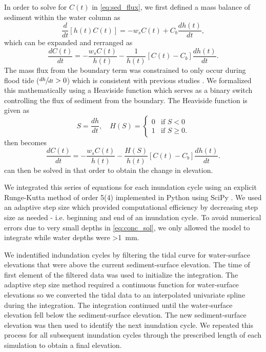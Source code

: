In order to solve for $C(t)$ in \cref{eq:sed_flux}, we first defined a mass balance of sediment within the water column as
\begin{equation}\label{eq:conc_mass_bal}
	\frac{d}{dt}[h(t)C(t)] = -w_s C(t) + C_b \frac{dh(t)}{dt},
\end{equation}
which can be expanded and rerranged as
\begin{equation}\label{eq:conc_dt}
	\frac{dC(t)}{dt} = - \frac{w_sC(t)}{h(t)} - \frac{1}{h(t)}[C(t) - C_b]\frac{dh(t)}{dt}.
\end{equation}
The mass flux from the boundary term was constrained to only occur during flood tide ($\sfrac{dh}{dt} > 0$) which is consistent with previous studies \citep{kroneMethodSimulatingMarsh1987, allenSaltmarshGrowthStratification1990, frenchNumericalSimulationVertical1993, temmermanModellingLongtermTidal2003, temmermanModellingEstuarineVariations2004}. We formalized this mathematically using a Heaviside function which serves as a binary switch controlling the flux of sediment from the boundary. The Heaviside function is given as
\begin{equation}\label{eq:heaviside}
	S = \frac{dh}{dt},\quad	H(S) =
	\begin{cases}
		0 & \text{if $S < 0$}\\
		1 & \text{if $S \geq 0$}.
	\end{cases}
\end{equation}
 then becomes
\begin{equation}\label{eq:conc_sol}
	\frac{dC(t)}{dt} = - \frac{w_s C(t)}{h(t)} - \frac{H(S)}{h(t)} [C(t) - C_b]\frac{dh(t)}{dt}.
\end{equation}
 can then be solved in that order to obtain the change in elevation.

We integrated this series of equations for each inundation cycle using an explicit Runge-Kutta method of order 5(4) \citep{dormandFamilyEmbeddedRungeKutta1980} implemented in Python using SciPy \citep{virtanenSciPyFundamentalAlgorithms2020}. We used an adaptive step size which provided computational efficiency by decreasing step size as needed - i.e. beginning and end of an inundation cycle. To avoid numerical errors due to very small depths in \cref{eq:conc_sol}, we only allowed the model to integrate while water depths were \SI{>1}{\milli\meter}.

We indentified indundation cycles by filtering the tidal curve for water-surface elevations that were above the current sediment-surface elevation. The time of first element of the filtered data was used to initialize the integration. The adaptive step size method required a continuous function for water-surface elevations so we converted the tidal data to an interpolated univariate spline during the integration. The integration continued until the water-surface elevation fell below the sediment-surface elevation. The new sediment-surface elevation was then used to identify the next inundation cycle. We repeated this process for all subsequent inundation cycles through the prescribed length of each simulation to obtain a final elevation.

